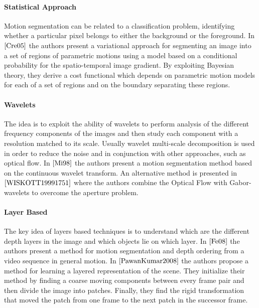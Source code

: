 \paragraph{Statistical Approach} Motion segmentation can be related to a classification problem, identifying whether a particular pixel belongs to either the background or the foreground. In $\cite{Cre05}$ the authors present a variational approach for segmenting an image into a set of regions of parametric motions using a model based on a conditional probability for the spatio-temporal image gradient. By exploiting Bayesian theory, they derive a cost functional which depends on parametric motion models for each  of a set of regions and on the boundary separating these regions.

\paragraph{Wavelets}
The idea is to exploit the ability of wavelets to perform analysis of the different frequency components of the images and then study each component with a resolution matched to its scale. Usually wavelet multi-scale decomposition is used in order to reduce the noise and in conjunction with other approaches, such as optical flow. In $\cite{Mi98}$ the authors present a motion segmentation method based on the continuous wavelet transform. An alternative method is presented in $\cite{WISKOTT19991751}$ where the authors combine the Optical Flow with Gabor-wavelets to overcome the aperture problem. 

\paragraph{Layer Based} The key idea of layers based techniques is to understand which are the different depth layers in the image and which objects lie on which layer. In $\cite{Fe08}$ the authors present a method for motion segmentation and depth ordering from a video sequence in general motion. In $\cite{PawanKumar2008}$ the authors propose a method for learning a layered representation of the scene. They initialize their method by finding a coarse moving components between every frame pair and then divide the image into patches. Finally, they find the rigid transformation that moved the patch from one frame to the next patch in the successor frame.

